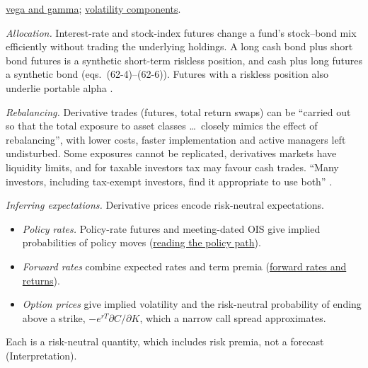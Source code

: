 \begin{qfmethod}
 \hyperref[meth:greeks-delta-gamma-hedging]{vega and gamma}; \hyperref[def:volatility-components]{volatility components}.

\end{qfmethod}

\begin{qfmethod}\label{meth:derivative-overlay-allocation}
 \emph{Allocation.} Interest-rate and stock-index futures change a fund's stock--bond mix efficiently without trading the underlying holdings. A long cash bond plus short bond futures is a synthetic short-term riskless position, and cash plus long futures a synthetic bond (eqs.~(62-4)--(62-6)). Futures with a riskless position also underlie portable alpha \citep[chap.~62, pp.~1535--1537]{s7-fabozzifixed}.

\emph{Rebalancing.} Derivative trades (futures, total return swaps) can be ``carried out so that the total exposure to asset classes \dots\ closely mimics the effect of rebalancing'', with lower costs, faster implementation and active managers left undisturbed. Some exposures cannot be replicated, derivatives markets have liquidity limits, and for taxable investors tax may favour cash trades. ``Many investors, including tax-exempt investors, find it appropriate to use both'' \citep[chap.~11, sec.~3.4, pp.~715--716]{managing-investment-portfolios-2007}.

\emph{Inferring expectations.} Derivative prices encode risk-neutral expectations.
\begin{itemize}
\item \emph{Policy rates.} Policy-rate futures and meeting-dated OIS give implied probabilities of policy moves (\hyperref[meth:policy-path-ois-futures]{reading the policy path}).
\item \emph{Forward rates} combine expected rates and term premia (\hyperref[meth:forward-rates-expected-returns]{forward rates and returns}).
\item \emph{Option prices} give implied volatility and the risk-neutral probability of ending above a strike, $-e^{rT}\partial C/\partial K$, which a narrow call spread approximates.
\end{itemize}
Each is a risk-neutral quantity, which includes risk premia, not a forecast (Interpretation).


\end{qfmethod}
